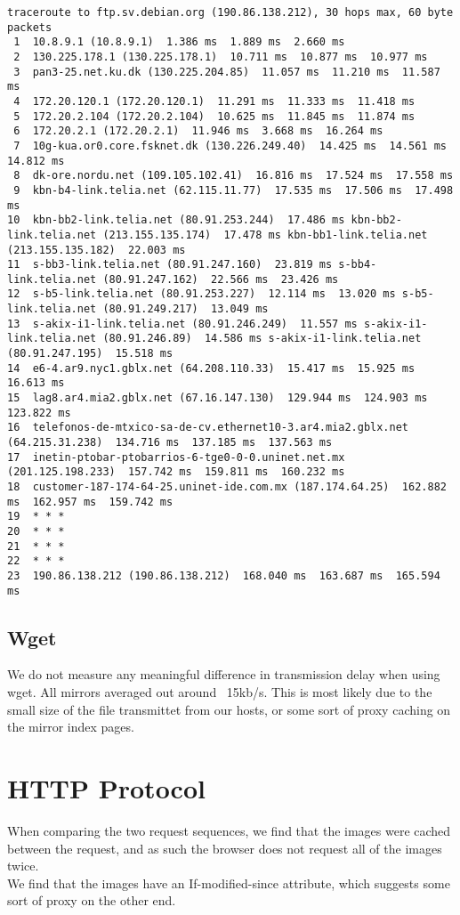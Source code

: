 \documentclass{acm_proc_article-sp}
\begin{document}
\pagebreak

\begin{lstlisting}
traceroute to ftp.sv.debian.org (190.86.138.212), 30 hops max, 60 byte packets
 1  10.8.9.1 (10.8.9.1)  1.386 ms  1.889 ms  2.660 ms
 2  130.225.178.1 (130.225.178.1)  10.711 ms  10.877 ms  10.977 ms
 3  pan3-25.net.ku.dk (130.225.204.85)  11.057 ms  11.210 ms  11.587 ms
 4  172.20.120.1 (172.20.120.1)  11.291 ms  11.333 ms  11.418 ms
 5  172.20.2.104 (172.20.2.104)  10.625 ms  11.845 ms  11.874 ms
 6  172.20.2.1 (172.20.2.1)  11.946 ms  3.668 ms  16.264 ms
 7  10g-kua.or0.core.fsknet.dk (130.226.249.40)  14.425 ms  14.561 ms  14.812 ms
 8  dk-ore.nordu.net (109.105.102.41)  16.816 ms  17.524 ms  17.558 ms
 9  kbn-b4-link.telia.net (62.115.11.77)  17.535 ms  17.506 ms  17.498 ms
10  kbn-bb2-link.telia.net (80.91.253.244)  17.486 ms kbn-bb2-link.telia.net (213.155.135.174)  17.478 ms kbn-bb1-link.telia.net (213.155.135.182)  22.003 ms
11  s-bb3-link.telia.net (80.91.247.160)  23.819 ms s-bb4-link.telia.net (80.91.247.162)  22.566 ms  23.426 ms
12  s-b5-link.telia.net (80.91.253.227)  12.114 ms  13.020 ms s-b5-link.telia.net (80.91.249.217)  13.049 ms
13  s-akix-i1-link.telia.net (80.91.246.249)  11.557 ms s-akix-i1-link.telia.net (80.91.246.89)  14.586 ms s-akix-i1-link.telia.net (80.91.247.195)  15.518 ms
14  e6-4.ar9.nyc1.gblx.net (64.208.110.33)  15.417 ms  15.925 ms  16.613 ms
15  lag8.ar4.mia2.gblx.net (67.16.147.130)  129.944 ms  124.903 ms  123.822 ms
16  telefonos-de-mtxico-sa-de-cv.ethernet10-3.ar4.mia2.gblx.net (64.215.31.238)  134.716 ms  137.185 ms  137.563 ms
17  inetin-ptobar-ptobarrios-6-tge0-0-0.uninet.net.mx (201.125.198.233)  157.742 ms  159.811 ms  160.232 ms
18  customer-187-174-64-25.uninet-ide.com.mx (187.174.64.25)  162.882 ms  162.957 ms  159.742 ms
19  * * *
20  * * *
21  * * *
22  * * *
23  190.86.138.212 (190.86.138.212)  168.040 ms  163.687 ms  165.594 ms
\end{lstlisting}

\twocolumn

\subsection{Wget}

We do not measure any meaningful difference in transmission delay when using wget. 
All mirrors averaged out around ~15kb/s. This is most likely due to the small size of the file transmittet from our hosts, or some sort of proxy caching on the mirror index pages.

\section{HTTP Protocol}

When comparing the two request sequences, we find that the images were cached between the request, and as such the browser does not request all of the images twice.\\
We find that the images have an If-modified-since attribute, which suggests some sort of proxy on the other end. 
\end{document}
